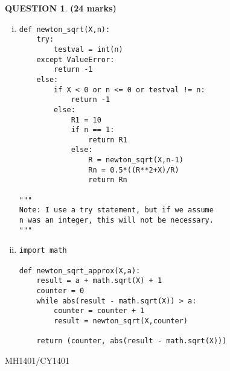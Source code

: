 \documentclass[a4paper,12pt]{article}
\theoremstyle{definition}
\newtheorem{ques}[dummy]{QUESTION}
\theoremstyle{plain}
\newcommand{\py}{python}
\begin{document}
	\begin{ques}\hfill\textbf{(24 marks)}\\
		\begin{enumerate}[(i)]
			\item 
			\begin{verbatim}
def newton_sqrt(X,n):
    try:
        testval = int(n)
    except ValueError:
        return -1
    else:
        if X < 0 or n <= 0 or testval != n:
            return -1
        else:
            R1 = 10
            if n == 1:
                return R1
            else:
                R = newton_sqrt(X,n-1)
                Rn = 0.5*((R**2+X)/R)
                return Rn

"""
Note: I use a try statement, but if we assume
n was an integer, this will not be necessary.
""" 
			\end{verbatim}
			\item
			\begin{verbatim}
import math

def newton_sqrt_approx(X,a):
    result = a + math.sqrt(X) + 1
    counter = 0
    while abs(result - math.sqrt(X)) > a:
        counter = counter + 1
        result = newton_sqrt(X,counter)
        
    return (counter, abs(result - math.sqrt(X)))
			\end{verbatim}
		\end{enumerate}
	\end{ques}
	
	\newpage
	\hfill MH1401/CY1401\vspace*{0.5em}
	
\end{document}
